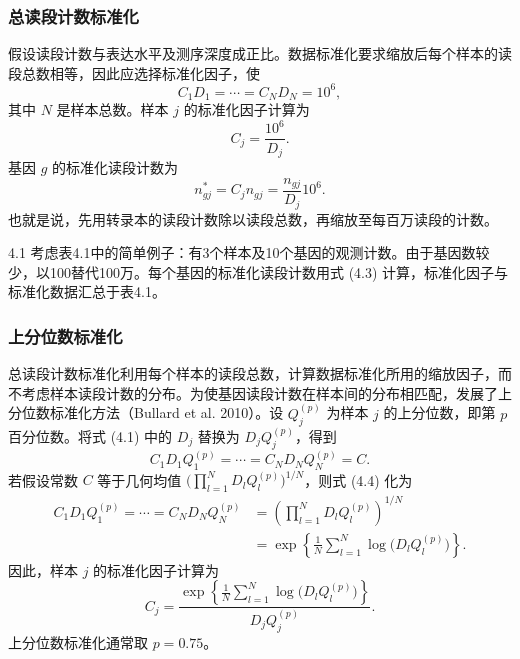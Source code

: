 \subsubsection{总读段计数标准化}

假设读段计数与表达水平及测序深度成正比。数据标准化要求缩放后每个样本的读段总数相等，因此应选择标准化因子，使
\begin{equation}
C_1D_1=\cdots=C_ND_N=10^6,
\tag{4.1}
\end{equation}
其中 $N$ 是样本总数。样本 $j$ 的标准化因子计算为
\begin{equation}
C_j=\frac{10^6}{D_j}.
\tag{4.2}
\end{equation}
基因 $g$ 的标准化读段计数为
\begin{equation}
n_{gj}^*=C_jn_{gj}=\frac{n_{gj}}{D_j}10^6.
\tag{4.3}
\end{equation}
也就是说，先用转录本的读段计数除以读段总数，再缩放至每百万读段的计数。

\begin{bookexample}{4.1}
考虑表4.1中的简单例子：有3个样本及10个基因的观测计数。由于基因数较少，以100替代100万。每个基因的标准化读段计数用式 (4.3) 计算，标准化因子与标准化数据汇总于表4.1。
\end{bookexample}


\subsubsection{上分位数标准化}

总读段计数标准化利用每个样本的读段总数，计算数据标准化所用的缩放因子，而不考虑样本读段计数的分布。为使基因读段计数在样本间的分布相匹配，发展了上分位数标准化方法（Bullard et al. 2010）。设 $Q_j^{(p)}$ 为样本 $j$ 的上分位数，即第 $p$ 百分位数。将式 (4.1) 中的 $D_j$ 替换为 $D_jQ_j^{(p)}$，得到
\begin{equation}
C_1D_1Q_1^{(p)}=\cdots=C_ND_NQ_N^{(p)}=C.
\tag{4.4}
\end{equation}
若假设常数 $C$ 等于几何均值 $\bigl(\prod_{l=1}^{N}D_lQ_l^{(p)}\bigr)^{1/N}$，则式 (4.4) 化为
\begin{equation}
\begin{aligned}
C_1D_1Q_1^{(p)}=\cdots=C_ND_NQ_N^{(p)}
&=\left(\prod_{l=1}^{N}D_lQ_l^{(p)}\right)^{1/N}\\
&=\exp\left\{\frac1N\sum_{l=1}^{N}\log\bigl(D_lQ_l^{(p)}\bigr)\right\}.
\end{aligned}
\tag{4.5}
\end{equation}
因此，样本 $j$ 的标准化因子计算为
\begin{equation}
C_j=\frac{\exp\left\{\frac1N\sum_{l=1}^{N}\log\bigl(D_lQ_l^{(p)}\bigr)\right\}}
{D_jQ_j^{(p)}}.
\tag{4.6}
\end{equation}
上分位数标准化通常取 $p=0.75$。

